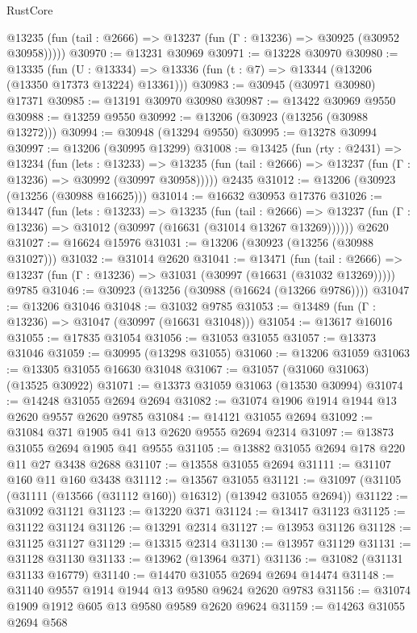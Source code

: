 \begin{lexlean}{RustCore}
\begin{coremodule}
      @13235 (fun (tail : @2666) => @13237 (fun (Γ : @13236) => @30925 (@30952 @30958)))))
@30970 := @13231 @30969
@30971 := @13228 @30970
@30980 := @13335
    (fun (U : @13334) => @13336 (fun (t : @7) => @13344 (@13206 (@13350 @17373 @13224) @13361)))
@30983 := @30945 (@30971 @30980) @17371
@30985 := @13191 @30970 @30980
@30987 := @13422 @30969 @9550
@30988 := @13259 @9550
@30992 := @13206 (@30923 (@13256 (@30988 @13272)))
@30994 := @30948 (@13294 @9550)
@30995 := @13278 @30994
@30997 := @13206 (@30995 @13299)
@31008 := @13425
    (fun (rty : @2431) =>
    @13234
      (fun (lets : @13233) =>
      @13235 (fun (tail : @2666) => @13237 (fun (Γ : @13236) => @30992 (@30997 @30958)))))
    @2435
@31012 := @13206 (@30923 (@13256 (@30988 @16625)))
@31014 := @16632 @30953 @17376
@31026 := @13447
    (fun (lets : @13233) =>
    @13235
      (fun (tail : @2666) =>
      @13237 (fun (Γ : @13236) => @31012 (@30997 (@16631 (@31014 @13267 @13269))))))
    @2620
@31027 := @16624 @15976
@31031 := @13206 (@30923 (@13256 (@30988 @31027)))
@31032 := @31014 @2620
@31041 := @13471
    (fun (tail : @2666) => @13237 (fun (Γ : @13236) => @31031 (@30997 (@16631 (@31032 @13269)))))
    @9785
@31046 := @30923 (@13256 (@30988 (@16624 (@13266 @9786))))
@31047 := @13206 @31046
@31048 := @31032 @9785
@31053 := @13489 (fun (Γ : @13236) => @31047 (@30997 (@16631 @31048)))
@31054 := @13617 @16016
@31055 := @17835 @31054
@31056 := @31053 @31055
@31057 := @13373 @31046
@31059 := @30995 (@13298 @31055)
@31060 := @13206 @31059
@31063 := @13305 @31055 @16630 @31048
@31067 := @31057 (@31060 @31063) (@13525 @30922)
@31071 := @13373 @31059 @31063 (@13530 @30994)
@31074 := @14248 @31055 @2694 @2694
@31082 := @31074 @1906 @1914 @1944 @13 @2620 @9557 @2620 @9785
@31084 := @14121 @31055 @2694
@31092 := @31084 @371 @1905 @41 @13 @2620 @9555 @2694 @2314
@31097 := @13873 @31055 @2694 @1905 @41 @9555
@31105 := @13882 @31055 @2694 @178 @220 @11 @27 @3438 @2688
@31107 := @13558 @31055 @2694
@31111 := @31107 @160 @11 @160 @3438
@31112 := @13567 @31055
@31121 := @31097 (@31105 (@31111 (@13566 (@31112 @160)) @16312) (@13942 @31055 @2694))
@31122 := @31092 @31121
@31123 := @13220 @371
@31124 := @13417 @31123
@31125 := @31122 @31124
@31126 := @13291 @2314
@31127 := @13953 @31126
@31128 := @31125 @31127
@31129 := @13315 @2314
@31130 := @13957 @31129
@31131 := @31128 @31130
@31133 := @13962 (@13964 @371)
@31136 := @31082 (@31131 @31133 @16779)
@31140 := @14470 @31055 @2694 @2694 @14474
@31148 := @31140 @9557 @1914 @1944 @13 @9580 @9624 @2620 @9783
@31156 := @31074 @1909 @1912 @605 @13 @9580 @9589 @2620 @9624
@31159 := @14263 @31055 @2694 @568

\end{coremodule}
\end{lexlean}
